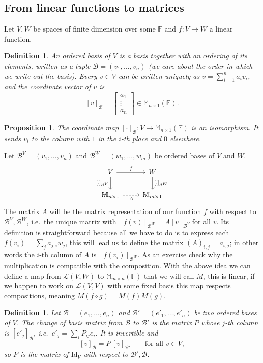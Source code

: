 \documentclass[12pt]{article}
\theoremstyle{breakplain}
\newtheorem{prop}[theorem]{Proposition}
\theoremstyle{breakdef}
\newtheorem{definition}[theorem]{Definition}
\theoremstyle{remark}
\begin{document}
\subsection{From linear functions to matrices}
Let $V,W$ be spaces of finite dimension over some $\mathbb{F}$ and $f:V\to W$ a linear function.
\begin{definition}
    An \emph{ordered basis} of $V$ is a basis together with an ordering of its elements, written as a tuple $\mathcal{B}=(v_1,\ldots,v_n)$ (we care about the order in which we write out the basis). Every $v\in V$ can be written uniquely as $v=\sum_{i=1}^n a_iv_i$, and the \emph{coordinate vector} of $v$ is
    \[[v]_{\mathcal{B}}=\begin{bmatrix} a_1\\ \vdots\\ a_n\end{bmatrix}\in\mathbb{M}_{n\times 1}(\mathbb{F}).\]
\end{definition}
\begin{prop}
    The coordinate map $[\cdot]_{\mathcal{B}}:V\to\mathbb{M}_{n\times1}(\mathbb{F})$ is an isomorphism. It sends $v_i$ to the column with $1$ in the $i$-th place and $0$ elsewhere.
\end{prop}
Let $\mathcal{B}^V=(v_1,\ldots ,v_n)$ and $\mathcal{B}^W=(w_1,\ldots ,w_m)$ be ordered bases of $V$ and $W$.
\[\begin{tikzcd}
	V & W \\
	{\mathbb{M}_{n\times1}} & {\mathbb{M}_{m\times1}}
	\arrow["f", from=1-1, to=1-2]
	\arrow["{[\cdot]_{\mathcal{B}^V}}"', from=1-1, to=2-1]
	\arrow["{[\cdot]_{\mathcal{B}^W}}", from=1-2, to=2-2]
	\arrow["A"', dashed, from=2-1, to=2-2]
\end{tikzcd}\]
The matrix $A$ will be the matrix representation of our function $f$ with respect to $\mathcal{B}^V,\mathcal{B}^W$, i.e.\ the unique matrix with $[f(v)]_{\mathcal{B}^W}=A[v]_{\mathcal{B}^V}$ for all $v$.
Its definition is straightforward because all we have to do is to express each $f(v_i)=\sum_j a_{j,i} w_j$, this will lead us to define the matrix $(A)_{i,j}=a_{i,j}$; in other words the $i$-th column of $A$ is $[f(v_i)]_{\mathcal{B}^W}$.
As an exercise check why the multiplication is compatible with the composition.
With the above idea we can define a map from $\mathcal{L}(V,W)$ to $\mathbb{M}_{m\times n}(\mathbb{F})$ that we will call $M$, this is linear, if we happen to work on $\mathcal{L}(V,V)$ with some fixed basis this map respects compositions, meaning $M(f\circ g)=M(f)M(g)$.
\begin{definition}
    Let $\mathcal{B}=(e_1,\ldots,e_n)$ and $\mathcal{B}'=(e'_1,\ldots,e'_n)$ be two ordered bases of $V$. The \emph{change of basis matrix} from $\mathcal{B}$ to $\mathcal{B}'$ is the matrix $P$ whose $j$-th column is $[e'_j]_{\mathcal{B}}$, i.e.\ $e'_j=\sum_iP_{ij}e_i$. It is invertible and
    \[[v]_{\mathcal{B}}=P\,[v]_{\mathcal{B}'}\qquad\text{for all } v\in V,\]
    so $P$ is the matrix of $\mathrm{Id}_V$ with respect to $\mathcal{B}',\mathcal{B}$.
\end{definition}
\end{document}
